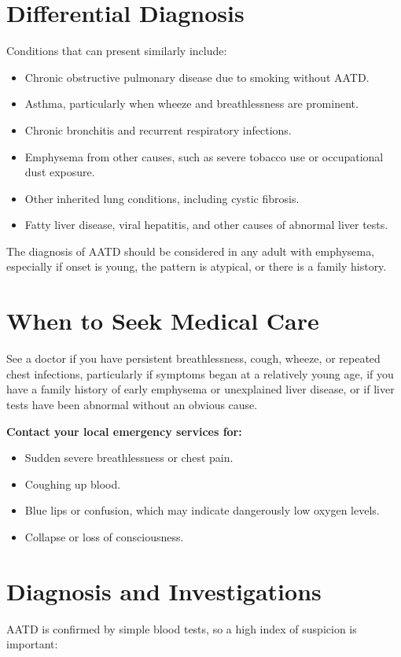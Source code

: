 \section*{Differential Diagnosis}
Conditions that can present similarly include:

\begin{itemize}
    \item Chronic obstructive pulmonary disease due to smoking without AATD.
    \item Asthma, particularly when wheeze and breathlessness are prominent.
    \item Chronic bronchitis and recurrent respiratory infections.
    \item Emphysema from other causes, such as severe tobacco use or occupational dust exposure.
    \item Other inherited lung conditions, including cystic fibrosis.
    \item Fatty liver disease, viral hepatitis, and other causes of abnormal liver tests.
\end{itemize}

The diagnosis of AATD should be considered in any adult with emphysema, especially if onset is young, the pattern is atypical, or there is a family history.

\section*{When to Seek Medical Care}
See a doctor if you have persistent breathlessness, cough, wheeze, or repeated chest infections, particularly if symptoms began at a relatively young age, if you have a family history of early emphysema or unexplained liver disease, or if liver tests have been abnormal without an obvious cause.

\textbf{Contact your local emergency services for:}
\begin{itemize}
    \item Sudden severe breathlessness or chest pain.
    \item Coughing up blood.
    \item Blue lips or confusion, which may indicate dangerously low oxygen levels.
    \item Collapse or loss of consciousness.
\end{itemize}

\section*{Diagnosis and Investigations}
AATD is confirmed by simple blood tests, so a high index of suspicion is important:

